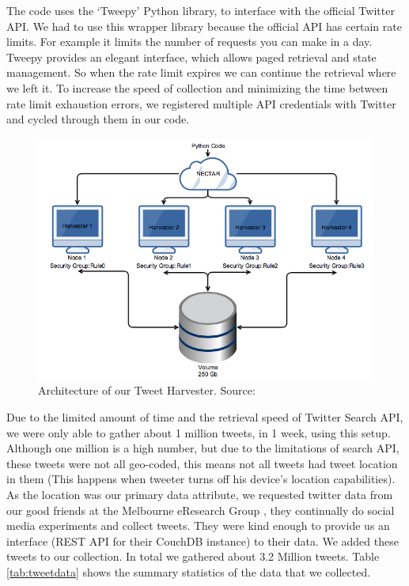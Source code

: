 \documentclass[12pt]{report}
\theoremstyle{named}
\begin{document}
The code uses the `Tweepy'\cite{Tweepy} Python library, to interface with the official Twitter API. We had to use this wrapper library because the official API has certain rate limits. For example it limits the number of requests you can make in a day. Tweepy provides an elegant interface, which allows paged retrieval and state management. So when the rate limit expires we can continue the retrieval where we left it. To increase the speed of collection and minimizing the time between rate limit exhaustion errors, we registered multiple API credentials with Twitter and cycled through them in our code.

\begin{figure}[ht]
\centering
        \includegraphics[width=120mm,scale=1]{Images/TweetHarvesting.png}
    \caption{Architecture of our Tweet Harvester. Source: \cite{clusterCloudReport}}
    \label{fig:tweetHarvester}
\end{figure}

Due to the limited amount of time and the retrieval speed of Twitter Search API, we were only able to gather about 1 million tweets, in 1 week, using this setup. Although one million is a high number, but due to the limitations of search API, these tweets were not all geo-coded, this means not all tweets had tweet location in them (This happens when tweeter turns off his device's location capabilities). As the location was our primary data attribute, we requested twitter data from our good friends at the Melbourne eResearch Group \cite{MelbEResrach}, they continually do social media experiments and collect tweets. They were kind enough to provide us an interface (REST API for their CouchDB instance) to their data. We added these tweets to our collection. In total we gathered about 3.2 Million tweets. Table \ref{tab:tweetdata} shows the summary statistics of the data that we collected.
\end{document}

